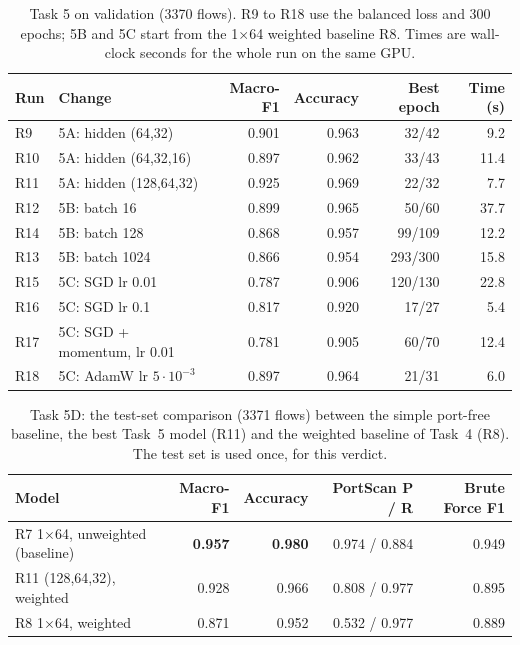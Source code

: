 \documentclass[9pt]{extarticle}
\newcommand{\run}[1]{\textsf{#1}}   %
\begin{document}
\begin{table}[htbp]
\centering\small
\caption{Task 5 on validation (3370 flows). \run{R9} to \run{R18} use the balanced loss and 300 epochs;
5B and 5C start from the 1$\times$64 weighted baseline \run{R8}. Times are wall-clock seconds for the
whole run on the same GPU.}
\label{tab:t5}
\begin{tabular}{@{}llrrrr@{}}
\toprule
Run & Change & Macro-F1 & Accuracy & Best epoch & Time (s)\\
\midrule
\run{R9}  & 5A: hidden (64,32)          & 0.901 & 0.963 &  32/42  &  9.2\\
\run{R10} & 5A: hidden (64,32,16)       & 0.897 & 0.962 &  33/43  & 11.4\\
\run{R11} & 5A: hidden (128,64,32)      & 0.925 & 0.969 &  22/32  &  7.7\\
\midrule
\run{R12} & 5B: batch 16                & 0.899 & 0.965 &  50/60  & 37.7\\
\run{R14} & 5B: batch 128               & 0.868 & 0.957 &  99/109 & 12.2\\
\run{R13} & 5B: batch 1024              & 0.866 & 0.954 & 293/300 & 15.8\\
\midrule
\run{R15} & 5C: SGD lr 0.01             & 0.787 & 0.906 & 120/130 & 22.8\\
\run{R16} & 5C: SGD lr 0.1              & 0.817 & 0.920 &  17/27  &  5.4\\
\run{R17} & 5C: SGD + momentum, lr 0.01 & 0.781 & 0.905 &  60/70  & 12.4\\
\run{R18} & 5C: AdamW lr $5\cdot10^{-3}$  & 0.897 & 0.964 &  21/31  &  6.0\\
\bottomrule
\end{tabular}
\end{table}

\begin{table}[htbp]
\centering\small
\caption{Task 5D: the test-set comparison (3371 flows) between the simple port-free baseline, the
best Task~5 model (\run{R11}) and the weighted baseline of Task~4 (\run{R8}). The test set is used
once, for this verdict.}
\label{tab:5d}
\begin{tabular}{@{}lrrrr@{}}
\toprule
Model & Macro-F1 & Accuracy & PortScan P / R & Brute Force F1\\
\midrule
\run{R7} 1$\times$64, unweighted (baseline) & \textbf{0.957} & \textbf{0.980} & 0.974 / 0.884 & 0.949\\
\run{R11} (128,64,32), weighted             & 0.928 & 0.966 & 0.808 / 0.977 & 0.895\\
\run{R8} 1$\times$64, weighted               & 0.871 & 0.952 & 0.532 / 0.977 & 0.889\\
\bottomrule
\end{tabular}
\end{table}
\end{document}

